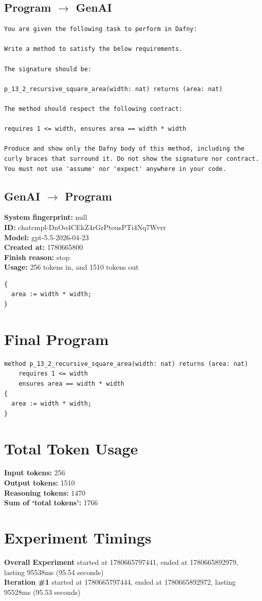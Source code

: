 \documentclass{article}
\begin{document}
\subsection*{Program $\rightarrow$ GenAI}
\begin{lstlisting}
You are given the following task to perform in Dafny:

Write a method to satisfy the below requirements.

The signature should be:

p_13_2_recursive_square_area(width: nat) returns (area: nat)

The method should respect the following contract:

requires 1 <= width, ensures area == width * width

Produce and show only the Dafny body of this method, including the curly braces that surround it. Do not show the signature nor contract. You must not use 'assume' nor 'expect' anywhere in your code.
\end{lstlisting}
\subsection*{GenAI $\rightarrow$ Program}
\textbf{System fingerprint: }null
\\\textbf{ID: }chatcmpl-DnOo4CEkZ4rGrPtousPTi4Nq7Wvrr
\\\textbf{Model: }gpt-5.5-2026-04-23
\\\textbf{Created at: }1780665800
\\\textbf{Finish reason: }stop
\\\textbf{Usage: }256 tokens in, and 1510 tokens out
\begin{lstlisting}
{
  area := width * width;
}
\end{lstlisting}
\section*{Final Program}
\begin{lstlisting}
method p_13_2_recursive_square_area(width: nat) returns (area: nat)
	requires 1 <= width
	ensures area == width * width
{
  area := width * width;
}
\end{lstlisting}
\section*{Total Token Usage}
\textbf{Input tokens: }256
\\\textbf{Output tokens: }1510
\\\textbf{Reasoning tokens: }1470
\\\textbf{Sum of `total tokens': }1766
\section*{Experiment Timings}
\textbf{Overall Experiment} started at 1780665797441, ended at 1780665892979, lasting 95538ms (95.54 seconds)
\\\textbf{Iteration \#1} started at 1780665797444, ended at 1780665892972, lasting 95528ms (95.53 seconds)
\end{document}
